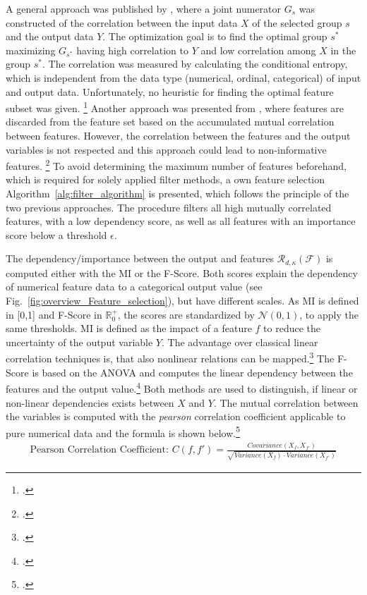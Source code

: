 A general approach was published by \cite{hall_feature_1997},
where a joint numerator $G_s$ was constructed of the correlation between the input data $X$ of the selected group $s$ and the output data $Y$.
The optimization goal is to find the optimal group $s^*$ maximizing $G_{s^*}$ having high correlation to $Y$ and low
correlation among $X$ in the group $s^*$. The correlation was measured by calculating the conditional entropy, which is independent
from the data type (numerical, ordinal, categorical) of input and output data. Unfortunately, no heuristic for finding the optimal
feature subset was given. \footcite[cf.][p. 856]{hall_feature_1997} Another approach was presented from \cite{haindl_feature_2006},
where features are discarded from the feature set based on the accumulated mutual correlation between features. However, the correlation between
the features and the output variables is not respected and this approach could lead to non-informative features. \footcite[cf.][]{haindl_feature_2006}
To avoid determining the maximum number of features beforehand, which is required for solely applied filter methods,
a own feature selection Algorithm~\ref{alg:filter_algorithm} is presented, which follows the principle of the two previous approaches.
The procedure filters all high mutually correlated features, with a low dependency score, as well as all features with an
importance score below a threshold $\epsilon$.



The dependency/importance between the output and features $\mathcal{R}_{d,\kappa}(\mathcal{F})$ is computed either with the
\gls{MI} or the \gls{F-Score}. Both scores explain the dependency of numerical feature data to a categorical output value (see Fig.~\ref{fig:overview_Feature_selection}),
but have different scales. As \gls{MI} is defined in [0,1] and \gls{F-Score} in $\mathbb{R}_0^+$, the scores are standardized by $\mathcal{N}(0,1)$, to
apply the same thresholds. \gls{MI} is defined as the impact of a feature $f$ to reduce the uncertainty of the output variable $Y$.
The advantage over classical linear correlation techniques is, that also nonlinear relations can be mapped.\footcite[cf.][p. 539f]{battiti_using_1994}
The \gls{F-Score} is based on the \gls{ANOVA} and computes the linear dependency between the features and the output value.\footcite[cf.][p. 2]{gu_generalized_2012}
Both methods are used to distinguish, if linear or non-linear dependencies exists between $X$ and $Y$. The mutual correlation between the variables
is computed with the \textit{pearson} correlation coefficient applicable to pure numerical data and the formula is shown below.\footcite[cf.][p. 17]{chandrashekar_survey_2014}
\begin{gather*}
    \text{Pearson Correlation Coefficient: } C(f,f') = \frac{Covariance(X_f,X_{f'})}{\sqrt{Variance(X_f)\cdot Variance(X_{f'})}}
\end{gather*}

